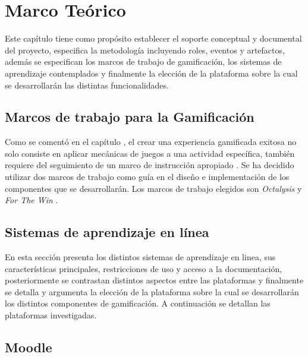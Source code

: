 \chapter{Marco Teórico}
\label{ch:marcoTeorico}

 Este capítulo tiene como propósito establecer el soporte conceptual y documental del proyecto,
 especifica la metodología incluyendo roles, eventos y artefactos, además se especifican los
 marcos de trabajo de gamificación, los sistemas de aprendizaje contemplados y finalmente
 la elección de la plataforma sobre la cual se desarrollarán las distintas funcionalidades.

    

\section{Marcos de trabajo para la Gamificación}

 Como se comentó en el capítulo , el crear una experiencia
 gamificada exitosa no solo consiste en aplicar mecánicas de juegos a una actividad
 específica, también requiere del seguimiento de un marco de instrucción apropiado \cite[p. 1110]{GamInE-Learning}.
 Se ha decidido utilizar dos marcos de trabajo como guía en el diseño e implementación
 de los componentes que se desarrollarán. Los marcos de trabajo elegidos son {\it Octalysis}
 \cite{Octalysis} y {\it For The Win} \cite{ForTheWin}.

    
    

\clearpage
\section{Sistemas de aprendizaje en línea}
\label{sec:sistemasaprendizaje}

 En esta sección presenta los distintos sistemas de aprendizaje en linea, sus características
 principales, restricciones de uso y acceso a la documentación, posteriormente se contrastan
 distintos aspectos entre las plataformas y finalmente se detalla y argumenta la elección de
 la plataforma sobre la cual se desarrollarán los distintos componentes de gamificación.
 A continuación se detallan las plataformas investigadas.

    

\clearpage
\section{Moodle}

